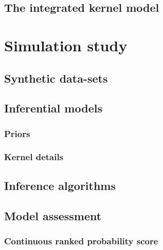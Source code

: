 \documentclass[a4paper, nobind]{templates/ociamthesis}
\begin{document}
\hypertarget{the-integrated-kernel-model}{%
\subsection{The integrated kernel model}\label{the-integrated-kernel-model}}

\hypertarget{simulation-study}{%
\section{Simulation study}\label{simulation-study}}

\hypertarget{synthetic-data-sets}{%
\subsection{Synthetic data-sets}\label{synthetic-data-sets}}

\hypertarget{inferential-models}{%
\subsection{Inferential models}\label{inferential-models}}

\hypertarget{priors}{%
\subsubsection{Priors}\label{priors}}

\hypertarget{kernel-details}{%
\subsubsection{Kernel details}\label{kernel-details}}

\hypertarget{inference-algorithms}{%
\subsection{Inference algorithms}\label{inference-algorithms}}

\hypertarget{model-assessment}{%
\subsection{Model assessment}\label{model-assessment}}

\hypertarget{continuous-ranked-probability-score}{%
\subsubsection{Continuous ranked probability score}\label{continuous-ranked-probability-score}}
\end{document}
